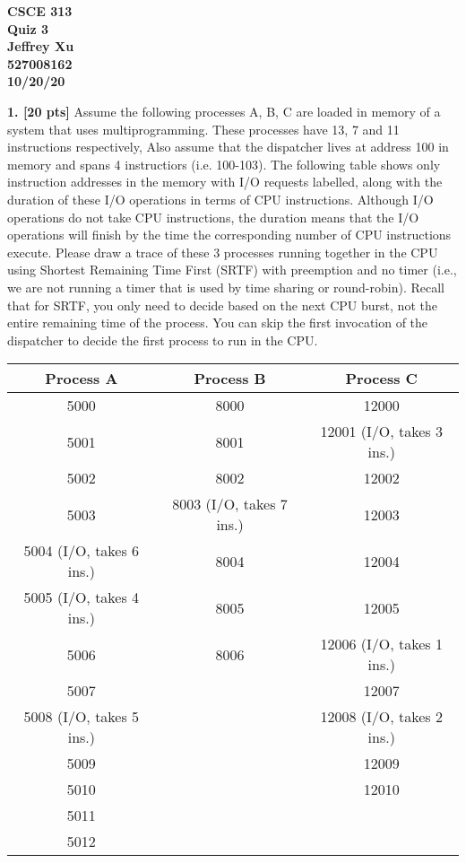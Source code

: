 \documentclass[12pt]{article}
\begin{document}
\begin{center}

{\bf
CSCE 313\\
Quiz 3\\
Jeffrey Xu\\
527008162\\
10/20/20\\
}

\end{center}

{\bf 1. [20 pts]} Assume the following processes A, B, C are loaded in memory of a system that uses multiprogramming. These processes have 13, 7 and 11 instructions respectively, Also assume that the dispatcher lives at address 100 in memory and spans 4 instructiors (i.e. 100-103). The following table shows only instruction addresses in the memory with I/O requests labelled, along with the duration of these I/O operations in terms of CPU instructions. Although I/O operations do not take CPU instructions, the duration means that the I/O operations will finish by the time the corresponding number of CPU instructions execute. Please draw a trace of these 3 processes running together in the CPU using Shortest Remaining Time First (SRTF) with preemption and no timer (i.e., we are not running a timer that is used by time sharing or round-robin). Recall that for SRTF, you only need to decide based on the next CPU burst, not the entire remaining time of the process. You can skip the first invocation of the dispatcher to decide the first process to run in the CPU.

\begin{center}
\begin{tabular}{| c | c | c |}
\hline
{\bf Process A} & {\bf Process B} & {\bf Process C}\\
\hline\hline
5000 & 8000 & 12000\\
\hline
5001 & 8001 & 12001 (I/O, takes 3 ins.)\\
\hline
5002 & 8002 & 12002\\
\hline
5003 & 8003 (I/O, takes 7 ins.) & 12003\\
\hline
5004 (I/O, takes 6 ins.) & 8004 & 12004\\
\hline
5005 (I/O, takes 4 ins.) & 8005 & 12005\\
\hline
5006 & 8006 & 12006 (I/O, takes 1 ins.)\\
\hline
5007 & & 12007\\
\hline
5008 (I/O, takes 5 ins.) & & 12008 (I/O, takes 2 ins.)\\
\hline
5009 & & 12009\\
\hline
5010 & & 12010\\
\hline
5011 & &\\
\hline
5012 & &\\
\hline
\end{tabular}
\end{center}
\end{document}

